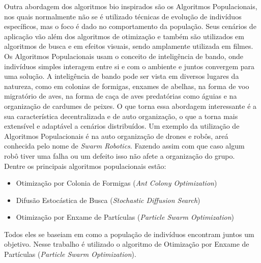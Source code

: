 \indent Outra abordagem dos algoritmos bio inspirados são os Algoritmos Populacionais, nos quais normalmente não se é utilizado técnicas de evolução de indivíduos específicos, mas o foco é dado no comportamento da população. 
%
Seus cenários de aplicação vão além dos algoritmos de otimização e também são utilizados em algoritmos de busca e em efeitos visuais, sendo amplamente utilizada em filmes. 
%
Os Algoritmos Populacionais usam o conceito de inteligência de bando, onde indivíduos simples interagem entre si e com o ambiente e juntos convergem para uma solução. 
%
A inteligência de bando pode ser vista em diversos lugares da natureza, como em colonias de formigas, enxames de abelhas, na forma de voo migratório de aves, na forma de caça de aves predatórias como águias e na organização de cardumes de peixes. 
%
O que torna essa abordagem interessante é a sua característica decentralizada e de auto organização, o que a torna mais extensível e adaptável a cenários distribuídos. 
%
Um exemplo da utilização de Algoritmos Populacionais é na auto organização de drones e robôs, areá conhecida pelo nome de \textit{Swarm Robotics}. Fazendo assim com que caso algum robô tiver uma falha ou um defeito isso não afete a organização do grupo.\\
        
\noindent Dentre os principais algoritmos populacionais estão:
\begin{itemize}
    \item Otimização por Colonia de Formigas (\textit{Ant Colony Optimization}) 
    \item Difusão Estocástica de Busca (\textit{Stochastic Diffusion Search})
    \item Otimização por Enxame de Partículas (\textit{Particle Swarm Optimization})
\end{itemize}

\noindent Todos eles se baseiam em como a população de indivíduos encontram juntos um objetivo. Nesse trabalho é utilizado o algoritmo de Otimização por Enxame de Partículas (\textit{Particle Swarm Optimization}). 
